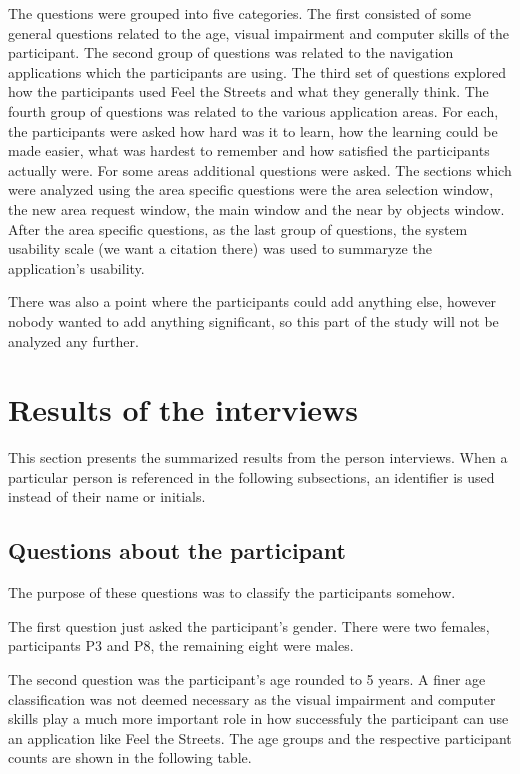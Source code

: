 \documentclass[nolof,digital]{fithesis3}
\begin{document}
The questions were grouped into five categories. The first consisted of some general questions related to the age, visual impairment and computer skills of the participant. The second group of questions was related to the navigation applications which the participants are using. The third set of questions explored how the participants used Feel the Streets and what they generally think. The fourth group of questions was related to the various application areas. For each, the participants were asked how hard was it to learn, how the learning could be made easier, what was hardest to remember and how satisfied the participants actually were. For some areas additional questions were asked. The sections which were analyzed using the area specific questions were the area selection window, the new area request window, the main window and the near by objects window. After the area specific questions, as the last group of questions, the system usability scale (we want a citation there) was used to summaryze the application's usability.

There was also a point where the participants could add anything else, however nobody wanted to add anything significant, so this part of the study will not be analyzed any further.
\section{Results of the interviews}
This section presents the summarized results from the person interviews. When a particular person is referenced in the following subsections, an identifier is used instead of their name or initials.
\subsection{Questions about the participant}
The purpose of these questions was to classify the participants somehow.

The first question just asked the participant's gender. There were two females, participants P3 and P8, the remaining eight were males.

The second question was the participant's age rounded to 5 years. A finer age classification was not deemed necessary as the visual impairment and computer skills play a much more important role in how successfuly the participant can use an application like Feel the Streets. The age groups and the respective participant counts are shown in the following table.
\end{document}
